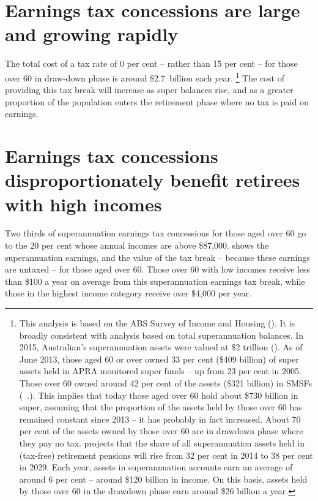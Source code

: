 \documentclass{grattanAlpha}
\begin{document}
\section{Earnings tax concessions are large and growing rapidly}\label{sec:SUPER-6-1}
The total cost of a tax rate of 0 per cent – rather than 15 per cent – for those over 60 in draw-down phase is around \$2.7~billion each year.%
\footnote{This analysis is based on the ABS Survey of Income and Housing (\textcite{ABS2015-Survey-of-income-and-housing-2013-14}). It is broadly consistent with analysis based on total superannuation balances. In 2015, Australian’s superannuation assets were valued at \$2 trillion (\textcites[][6]{APRA2015JuneSuperPerformance}[][7]{MinifieSavageCameron2015}). As of June 2013, those aged 60 or over owned 33 per cent (\$409 billion) of super assets held in APRA monitored super funds – up from 23 per cent in 2005. Those over 60 owned around 42 per cent of the assets (\$321 billion) in SMSFs (\gao\ \textcite{ATO2014e}.). This implies that today those aged over 60 hold about \$730 billion in super, assuming that the proportion of the assets held by those over 60 has remained constant since 2013 – it has probably in fact increased. About 70 per cent of the assets owned by those over 60 are in drawdown phase where they pay no tax. \textcite[][23]{RiceWarner2015SubmissionTaxWhitePaper} projects that the share of all superannuation assets held in (tax-free) retirement pensions will rise from 32 per cent in 2014 to 38 per cent in 2029. Each year, assets in superannuation accounts earn an average of around 6 per cent – around \$120 billion in income. On this basis, assets held by those over 60 in the drawdown phase earn around \$26 billion a year.}  The cost of providing this tax break will increase as super balances rise, and as a greater proportion of the population enters the retirement phase where no tax is paid on earnings. 

\section{Earnings tax concessions disproportionately benefit retirees with high incomes}\label{sec:SUPER-6-2}
Two thirds of superannuation earnings tax concessions for those aged over 60 go to the 20 per cent whose annual incomes are above \$87,000.  shows the superannuation earnings, and the value of the tax break – because these earnings are untaxed – for those aged over 60. Those over 60 with low incomes receive less than \$100 a year on average from this superannuation earnings tax break, while those in the highest income category receive over \$4,000 per year.
\end{document}
